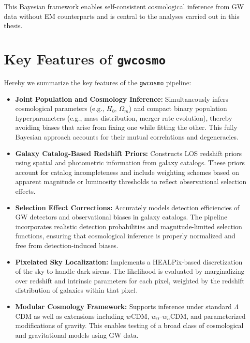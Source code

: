This Bayesian framework enables self-consistent cosmological inference from \ac{GW} data without \ac{EM} counterparts and is central to the analyses carried out in this thesis.

\section{Key Features of \texttt{gwcosmo}}
Hereby we summarize the key features of the \texttt{gwcosmo} pipeline:
\begin{itemize}
  \item \textbf{Joint Population and Cosmology Inference:} Simultaneously infers cosmological parameters (e.g., $H_0$, $\Omega_m$) and compact binary population hyperparameters (e.g., mass distribution, merger rate evolution), thereby avoiding biases that arise from fixing one while fitting the other. This fully Bayesian approach accounts for their mutual correlations and degeneracies.

  \item \textbf{Galaxy Catalog-Based Redshift Priors:} Constructs \acf{LOS} redshift priors using spatial and photometric information from galaxy catalogs. These priors account for catalog incompleteness and include weighting schemes based on apparent magnitude or luminosity thresholds to reflect observational selection effects.

  \item \textbf{Selection Effect Corrections:} Accurately models detection efficiencies of \ac{GW} detectors and observational biases in galaxy catalogs. The pipeline incorporates realistic detection probabilities and magnitude-limited selection functions, ensuring that cosmological inference is properly normalized and free from detection-induced biases.

  \item \textbf{Pixelated Sky Localization:} Implements a HEALPix-based discretization of the sky to handle dark sirens. The likelihood is evaluated by marginalizing over redshift and intrinsic parameters for each pixel, weighted by the redshift distribution of galaxies within that pixel.

  \item \textbf{Modular Cosmology Framework:} Supports inference under standard $\Lambda$CDM as well as extensions including $w$CDM, $w_0$--$w_a$CDM, and parameterized modifications of gravity. This enables testing of a broad class of cosmological and gravitational models using \ac{GW} data.
\end{itemize}

